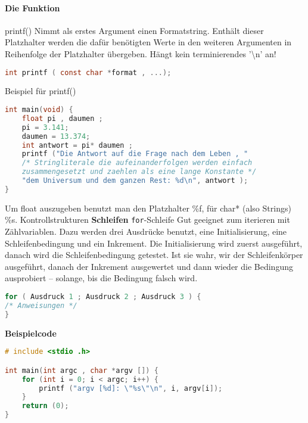 \documentclass[paper=a4,fontsize=11pt]{scrartcl}%
\numberwithin{equation}{section}
\begin{document}
\paragraph{Die Funktion} printf() Nimmt als erstes Argument einen Formatstring. Enthält dieser
Platzhalter werden die dafür benötigten Werte in den weiteren Argumenten in Reihenfolge
der Platzhalter übergeben. Hängt kein terminierendes '\textbackslash n' an!

\begin{lstlisting}[language=C]
int printf ( const char *format , ...);
\end{lstlisting}
Beispiel für printf()
\begin{lstlisting}[language=C]
int main(void) {
	float pi , daumen ;
	pi = 3.141;
	daumen = 13.374;
	int antwort = pi* daumen ;
	printf ("Die Antwort auf die Frage nach dem Leben , "
	/* Stringliterale die aufeinanderfolgen werden einfach
	zusammengesetzt und zaehlen als eine lange Konstante */
	"dem Universum und dem ganzen Rest: %d\n", antwort );
}
\end{lstlisting}
Um float auszugeben benutzt man den Platzhalter \%f, für char* (also Strings) \%s.
\Large{Kontrollstrukturen}
\textbf{Schleifen}
\texttt{for}-Schleife Gut geeignet zum iterieren mit Zählvariablen. Dazu werden drei Ausdrücke benutzt, eine Initialisierung, eine Schleifenbedingung und ein Inkrement. Die Initialisierung wird zuerst ausgeführt, danach wird die Schleifenbedingung getestet. Ist sie wahr, wir der Schleifenkörper ausgeführt, danach der Inkrement ausgewertet und dann wieder die Bedingung ausprobiert – solange, bis die Bedingung falsch wird.
\begin{lstlisting}[language=C]
for ( Ausdruck 1 ; Ausdruck 2 ; Ausdruck 3 ) {
/* Anweisungen */
}
\end{lstlisting}
\textbf{Beispielcode}

\begin{lstlisting}[language=C]
# include <stdio .h>

int main(int argc , char *argv []) {
	for (int i = 0; i < argc; i++) {
		printf ("argv [%d]: \"%s\"\n", i, argv[i]);
	}
	return (0);
}
\end{lstlisting}
\end{document}
